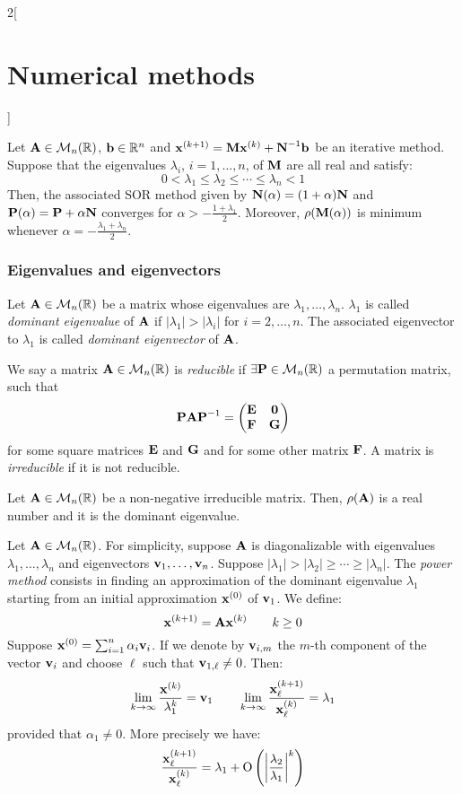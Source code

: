 \documentclass[../../../main_math.tex]{subfiles}
\begin{document}
\begin{multicols}{2}[\section{Numerical methods}]
  \begin{theorem}
    Let $\boldsymbol{\mathrm{A}}\in\mathcal{M}_n(\mathbb{R})$, $\boldsymbol{\mathrm{b}}\in\mathbb{R}^n$ and $\boldsymbol{\mathrm{x}}^{(k+1)}=\boldsymbol{\mathrm{M}}\boldsymbol{\mathrm{x}}^{(k)}+\boldsymbol{\mathrm{N}}^{-1}\boldsymbol{\mathrm{b}}$ be an iterative method. Suppose that the eigenvalues $\lambda_i$, $i=1,\ldots,n$, of $\boldsymbol{\mathrm{M}}$ are all real and satisfy: $$0<\lambda_1\leq\lambda_2\leq\cdots\leq\lambda_n<1$$
    Then, the associated SOR method given by $\boldsymbol{\mathrm{N}}(\alpha)=(1+\alpha)\boldsymbol{\mathrm{N}}$ and $\boldsymbol{\mathrm{P}}(\alpha)=\boldsymbol{\mathrm{P}}+\alpha\boldsymbol{\mathrm{N}}$ converges for $\alpha>-\frac{1+\lambda_1}{2}$. Moreover, $\rho(\boldsymbol{\mathrm{M}}(\alpha))$ is minimum whenever $\alpha=-\frac{\lambda_1+\lambda_n}{2}$.
  \end{theorem}
  \subsubsection{Eigenvalues and eigenvectors}
  \begin{definition}
    Let $\boldsymbol{\mathrm{A}}\in\mathcal{M}_n(\mathbb{R})$ be a matrix whose eigenvalues are $\lambda_1,\ldots,\lambda_n$. $\lambda_1$ is called \emph{dominant eigenvalue} of $\boldsymbol{\mathrm{A}}$ if $|\lambda_1|>|\lambda_i|$ for $i=2,\ldots,n$. The associated eigenvector to $\lambda_1$ is called \emph{dominant eigenvector} of $\boldsymbol{\mathrm{A}}$.
  \end{definition}
  \begin{definition}
    We say a matrix $\boldsymbol{\mathrm{A}}\in\mathcal{M}_n(\mathbb{R})$ is \emph{reducible} if $\exists\boldsymbol{\mathrm{P}}\in\mathcal{M}_n(\mathbb{R})$ a permutation matrix, such that $$\boldsymbol{\mathrm{P}}\boldsymbol{\mathrm{A}}\boldsymbol{\mathrm{P}}^{-1}=
      \begin{pmatrix}
        \boldsymbol{\mathrm{E}} & \boldsymbol{\mathrm{0}} \\
        \boldsymbol{\mathrm{F}} & \boldsymbol{\mathrm{G}}
      \end{pmatrix}$$ for some square matrices $\boldsymbol{\mathrm{E}}$ and $\boldsymbol{\mathrm{G}}$ and for some other matrix $\boldsymbol{\mathrm{F}}$. A matrix is \emph{irreducible} if it is not reducible.
  \end{definition}
  \begin{theorem}
    Let $\boldsymbol{\mathrm{A}}\in\mathcal{M}_n(\mathbb{R})$ be a non-negative irreducible matrix. Then, $\rho(\boldsymbol{\mathrm{A}})$ is a real number and it is the dominant eigenvalue.
  \end{theorem}
  \begin{method}
    Let $\boldsymbol{\mathrm{A}}\in\mathcal{M}_n(\mathbb{R})$. For simplicity, suppose $\boldsymbol{\mathrm{A}}$ is diagonalizable with eigenvalues $\lambda_1,\ldots,\lambda_n$ and eigenvectors $\boldsymbol{\mathrm{v}}_1,\ldots,\boldsymbol{\mathrm{v}}_n$. Suppose $|\lambda_1|>|\lambda_2|\geq\cdots\geq|\lambda_n|$. The \emph{power method} consists in finding an approximation of the dominant eigenvalue $\lambda_1$ starting from an initial approximation $\boldsymbol{\mathrm{x}}^{(0)}$ of $\boldsymbol{\mathrm{v}}_1$. We define: $$\boldsymbol{\mathrm{x}}^{(k+1)}=\boldsymbol{\mathrm{A}}\boldsymbol{\mathrm{x}}^{(k)}\qquad k\geq 0$$ Suppose $\boldsymbol{\mathrm{x}}^{(0)}=\sum_{i=1}^n\alpha_i\boldsymbol{\mathrm{v}}_i$. If we denote by $\boldsymbol{\mathrm{v}}_{i,m}$ the $m$-th component of the vector $\boldsymbol{\mathrm{v}}_i$ and choose $\ell$ such that $\boldsymbol{\mathrm{v}}_{1,\ell}\ne0$. Then: $$\lim_{k\to\infty}\frac{\boldsymbol{\mathrm{x}}^{(k)}}{\lambda_1^k}=\boldsymbol{\mathrm{v}}_1\qquad\lim_{k\to\infty}\frac{\boldsymbol{\mathrm{x}}_\ell^{(k+1)}}{\boldsymbol{\mathrm{x}}_\ell^{(k)}}=\lambda_1$$ provided that $\alpha_1\ne0$. More precisely we have: $$\frac{\boldsymbol{\mathrm{x}}_\ell^{(k+1)}}{\boldsymbol{\mathrm{x}}_\ell^{(k)}}=\lambda_1+\mathrm{O}\left(\left|\frac{\lambda_2}{\lambda_1}\right|^k\right)$$

\end{method}
\end{multicols}
\end{document}
